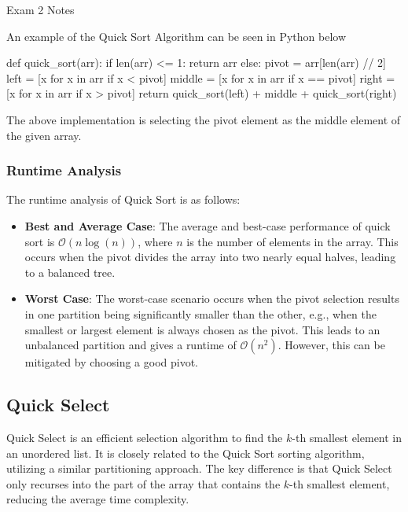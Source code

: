 \begin{examnotes}{Exam 2 Notes}
    \begin{highlight}
        An example of the Quick Sort Algorithm can be seen in Python below

    \begin{code}[Python]
    def quick_sort(arr):
    if len(arr) <= 1:
        return arr
    else:
        pivot = arr[len(arr) // 2]
        left = [x for x in arr if x < pivot]
        middle = [x for x in arr if x == pivot]
        right = [x for x in arr if x > pivot]
        return quick_sort(left) + middle + quick_sort(right)    
    \end{code}
    The above implementation is selecting the pivot element as the middle element of the given array.
    \end{highlight}

    \subsubsection*{Runtime Analysis}

    The runtime analysis of Quick Sort is as follows:
    \begin{itemize}
        \item \textbf{Best and Average Case}: The average and best-case performance of quick sort is $\mathcal{O}(n\log{(n)})$, where $n$ is the number of elements in the array. This occurs when the 
        pivot divides the array into two nearly equal halves, leading to a balanced tree.
        \item \textbf{Worst Case}: The worst-case scenario occurs when the pivot selection results in one partition being significantly smaller than the other, e.g., when the smallest or largest element 
        is always chosen as the pivot. This leads to an unbalanced partition and gives a runtime of $\mathcal{O}(n^{2})$. However, this can be mitigated by choosing a good pivot.
    \end{itemize}

    \subsection*{Quick Select}

    Quick Select is an efficient selection algorithm to find the $k$-th smallest element in an unordered list. It is closely related to the Quick Sort sorting algorithm, utilizing a similar partitioning 
    approach. The key difference is that Quick Select only recurses into the part of the array that contains the $k$-th smallest element, reducing the average time complexity.
    

\end{examnotes}
